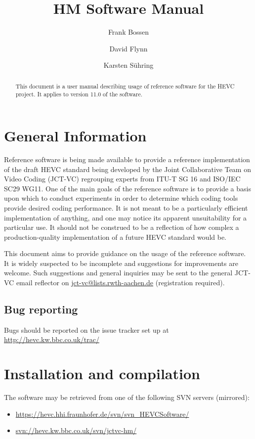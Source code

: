 \documentclass[a4paper,11pt]{jctvcdoc}
\title{HM Software Manual}
\author{%
	Frank Bossen
	\email{bossen@docomoinnovations.com}
	\and
	David Flynn
	\email{davidf@rd.bbc.co.uk}
	\and
	Karsten S\"uhring
	\email{Karsten.Suehring@hhi.fraunhofer.de}
}
\begin{document}
\maketitle
\begin{abstract}
This document is a user manual describing usage of reference software
for the HEVC project. It applies to version 11.0
of the software.
\end{abstract}

\tableofcontents
\listoftables

\section{General Information}
Reference software is being made available to provide a reference
implementation of the draft HEVC standard being developed by the Joint
Collaborative Team on Video Coding (JCT-VC) regrouping experts from
ITU-T SG 16 and ISO/IEC SC29 WG11. One of the main goals of the
reference software is to provide a basis upon which to conduct
experiments in order to determine which coding tools provide desired
coding performance. It is not meant to be a particularly efficient
implementation of anything, and one may notice its apparent
unsuitability for a particular use. It should not be construed to be a
reflection of how complex a production-quality implementation of a
future HEVC standard would be.

This document aims to provide guidance on the usage of the reference
software. It is widely suspected to be incomplete and suggestions for
improvements are welcome. Such suggestions and general inquiries may be
sent to the general JCT-VC email reflector on
\url{jct-vc@lists.rwth-aachen.de} (registration required).

\subsection*{Bug reporting}
Bugs should be reported on the issue tracker set up at
\url{http://hevc.kw.bbc.co.uk/trac/}

\section{Installation and compilation}
The software may be retrieved from one of the following SVN servers
(mirrored):
\begin{itemize}
\item \url{https://hevc.hhi.fraunhofer.de/svn/svn_HEVCSoftware/}
\item \url{svn://hevc.kw.bbc.co.uk/svn/jctvc-hm/}
\end{itemize}
\end{document}
